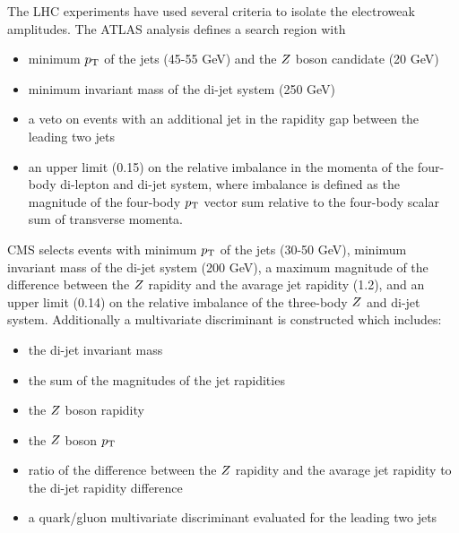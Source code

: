 The LHC experiments have used several criteria to isolate the electroweak amplitudes.  The ATLAS analysis
defines a search region with
\begin{itemize}
    \item minimum $p_{\mathrm{T}}$ of the jets (45-55 GeV) and the $Z$ boson candidate (20 GeV)
    \item minimum invariant mass of the di-jet system (250 GeV)
    \item a veto on events with an additional jet in the rapidity gap between the leading two jets
    \item an upper limit (0.15) on the relative imbalance in the momenta of the four-body di-lepton and di-jet system, where
    imbalance is defined as the magnitude of the four-body $p_{\mathrm{T}}$ vector sum relative to the four-body scalar sum of transverse momenta.
  \end{itemize}

CMS selects events with minimum $p_{\mathrm{T}}$ of the jets (30-50 GeV), minimum invariant mass of the di-jet system (200 GeV), a maximum
magnitude of the difference between the $Z$ rapidity and the avarage jet rapidity (1.2), and an upper
limit (0.14) on the relative imbalance of the three-body $Z$ and di-jet system.
Additionally a multivariate discriminant is constructed which includes:
\begin{itemize}
  \item the di-jet invariant mass
  \item the sum of the magnitudes of the jet rapidities
  \item the $Z$ boson rapidity
  \item the $Z$ boson $p_{\mathrm{T}}$
  \item ratio of the difference between the $Z$ rapidity and the avarage jet rapidity to the di-jet rapidity difference
  \item a quark/gluon multivariate discriminant evaluated for the leading two jets
\end{itemize}

